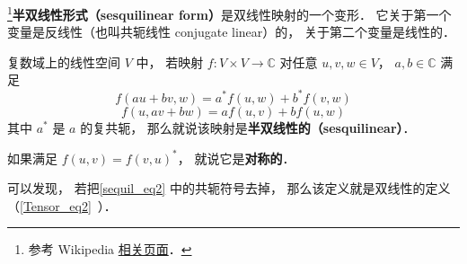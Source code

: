 
\begin{issues}
\issueDraft
\end{issues}

\footnote{参考 Wikipedia \href{https://en.wikipedia.org/wiki/Sesquilinear_form}{相关页面}．}\textbf{半双线性形式（sesquilinear form）}是双线性映射的一个变形． 它关于第一个变量是反线性（也叫共轭线性 conjugate linear）的， 关于第二个变量是线性的．
\begin{definition}{}\label{sequil_def1}
复数域上的线性空间 $V$ 中， 若映射 $f:V\times V\to \mathbb C$ 对任意 $u, v, w\in V$， $a,b\in \mathbb C$ 满足
\begin{equation}\label{sequil_eq2}
f(au+bv, w) = a^*f(u, w) + b^*f(v, w)
\end{equation}
\begin{equation}\label{sequil_eq1}
f(u, av+bw) = af(u, v) + bf(u, w)
\end{equation}
其中 $a^*$ 是 $a$ 的复共轭， 那么就说该映射是\textbf{半双线性的（sesquilinear）}．
\end{definition}
如果满足 $f(u, v) = f(v, u)^*$， 就说它是\textbf{对称的}．

可以发现， 若把\autoref{sequil_eq2} 中的共轭符号去掉， 那么该定义就是双线性的定义（\autoref{Tensor_eq2}~）．

